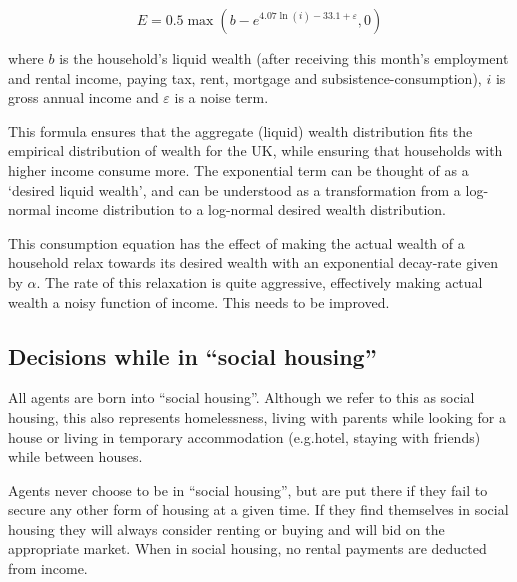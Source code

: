 \documentclass{report}
\begin{document}
\begin{equation}
E=0.5 \max \left( b-e^{4.07\ln (i)-33.1+\varepsilon },0\right)
\label{consumption}
\end{equation}

where $b$ is the household's liquid wealth (after receiving this month's employment and rental income, paying tax, rent, mortgage and subsistence-consumption), $i$ is gross annual income and $\varepsilon$ is a noise term.

This formula ensures that the aggregate (liquid) wealth distribution fits the empirical distribution of wealth for the UK, while ensuring that households with higher income consume more. The exponential term can be thought of as a `desired liquid wealth', and can be understood as a transformation from a log-normal income distribution to a log-normal desired wealth distribution.

This consumption equation has the effect of making the actual wealth of a household relax towards its desired wealth with an exponential decay-rate given by $\alpha$. The rate of this relaxation is quite aggressive, effectively making actual wealth a noisy function of income. This needs to be improved.

\subsection{Decisions while in ``social housing''}
All agents are born into ``social housing''. Although we refer to this as social housing, this also represents homelessness, living with parents while looking for a house or living in temporary accommodation (e.g.hotel, staying with friends) while between houses.

Agents never choose to be in ``social housing'', but are put there if they fail to secure any other form of housing at a given time. If they find themselves in social housing they will always consider renting or buying and will bid on the appropriate market. When in social housing, no rental payments are deducted from income.
\end{document}
